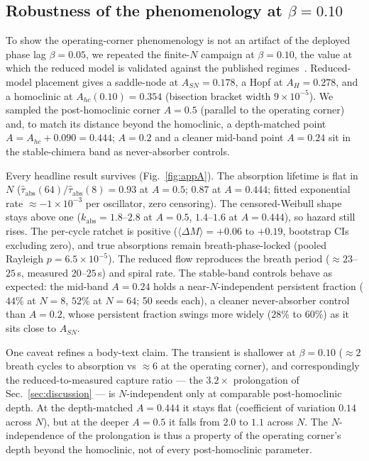 \documentclass[pdflatex,sn-mathphys,Numbered]{sn-jnl}
\begin{document}
\begin{appendices}

\section{Robustness of the phenomenology at $\beta = 0.10$}\label{app:beta}

To show the operating-corner phenomenology is not an artifact of the deployed phase
lag $\beta = 0.05$, we repeated the finite-$N$ campaign at $\beta = 0.10$, the value
at which the reduced model is validated against the published
regimes~\cite{abrams2008}. Reduced-model placement gives a saddle-node at
$A_{SN} = 0.178$, a Hopf at $A_H = 0.278$, and a homoclinic at
$A_{hc}(0.10) = 0.354$ (bisection bracket width $9\times10^{-5}$). We sampled the
post-homoclinic corner $A = 0.5$ (parallel to the operating corner) and, to match its
distance beyond the homoclinic, a depth-matched point
$A = A_{hc} + 0.090 = 0.444$; $A = 0.2$ and a cleaner mid-band point $A = 0.24$ sit
in the stable-chimera band as never-absorber controls.

Every headline result survives (Fig.~\ref{fig:appA}). The absorption lifetime is flat
in $N$ ($\hat\tau_{\mathrm{abs}}(64)/\hat\tau_{\mathrm{abs}}(8) = 0.93$ at $A = 0.5$;
$0.87$ at $A = 0.444$; fitted exponential rate $\approx -1\times10^{-3}$ per
oscillator, zero censoring). The censored-Weibull shape stays above one
($k_{\mathrm{abs}} = 1.8$--$2.8$ at $A = 0.5$, $1.4$--$1.6$ at $A = 0.444$), so hazard
still rises. The per-cycle ratchet is positive
($\langle\Delta M\rangle = +0.06$ to $+0.19$, bootstrap CIs excluding zero), and true
absorptions remain breath-phase-locked (pooled Rayleigh $p = 6.5\times10^{-5}$). The
reduced flow reproduces the breath period ($\approx 23$--$25$\,s, measured
$20$--$25$\,s) and spiral rate. The stable-band controls behave as expected: the
mid-band $A = 0.24$ holds a near-$N$-independent persistent fraction ($44\%$ at
$N = 8$, $52\%$ at $N = 64$; 50 seeds each), a cleaner never-absorber control than
$A = 0.2$, whose persistent fraction swings more widely ($28\%$ to $60\%$) as it sits
close to $A_{SN}$.

One caveat refines a body-text claim. The transient is shallower at $\beta = 0.10$
($\approx 2$ breath cycles to absorption vs $\approx 6$ at the operating corner), and
correspondingly the reduced-to-measured capture ratio --- the $3.2\times$ prolongation
of Sec.~\ref{sec:discussion} --- is $N$-independent only at comparable post-homoclinic
depth. At the depth-matched $A = 0.444$ it stays flat (coefficient of variation $0.14$
across $N$), but at the deeper $A = 0.5$ it falls from $2.0$ to $1.1$ across $N$. The
$N$-independence of the prolongation is thus a property of the operating corner's
depth beyond the homoclinic, not of every post-homoclinic parameter.


\end{appendices}
\end{document}
